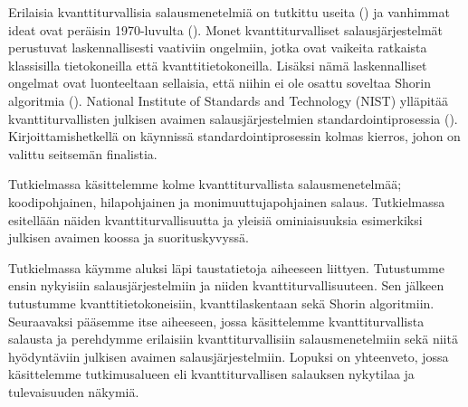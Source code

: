 Erilaisia kvanttiturvallisia salausmenetelmiä on tutkittu useita (\cite{mavroeidis2018impact}) ja vanhimmat ideat ovat peräisin 1970-luvulta (\cite{repka2014overview}). Monet kvanttiturvalliset salausjärjestelmät perustuvat laskennallisesti vaativiin ongelmiin, jotka ovat vaikeita ratkaista klassisilla tietokoneilla että kvanttitietokoneilla. %
 Lisäksi nämä laskennalliset ongelmat ovat luonteeltaan sellaisia, että niihin ei ole osattu soveltaa Shorin algoritmia (\cite{bernstein2017post}). National Institute of Standards and Technology (NIST) ylläpitää kvanttiturvallisten julkisen avaimen salausjärjestelmien standardointiprosessia (\cite{alagic2020status}). Kirjoittamishetkellä on käynnissä standardointiprosessin kolmas kierros, johon on valittu seitsemän finalistia. 
 
 Tutkielmassa käsittelemme kolme kvanttiturvallista salausmenetelmää; koodipohjainen, hilapohjainen ja monimuuttujapohjainen salaus. Tutkielmassa esitellään näiden kvanttiturvallisuutta ja yleisiä ominiaisuuksia esimerkiksi julkisen avaimen koossa ja suorituskyvyssä.
 
Tutkielmassa käymme aluksi läpi taustatietoja aiheeseen liittyen. Tutustumme ensin nykyisiin salausjärjestelmiin ja niiden kvanttiturvallisuuteen. Sen jälkeen tutustumme kvanttitietokoneisiin, kvanttilaskentaan sekä Shorin algoritmiin. Seuraavaksi pääsemme itse aiheeseen, jossa käsittelemme kvanttiturvallista salausta ja perehdymme erilaisiin kvanttiturvallisiin salausmenetelmiin sekä niitä hyödyntäviin julkisen avaimen salausjärjestelmiin. Lopuksi on yhteenveto, jossa käsittelemme tutkimusalueen eli kvanttiturvallisen salauksen nykytilaa ja tulevaisuuden näkymiä.